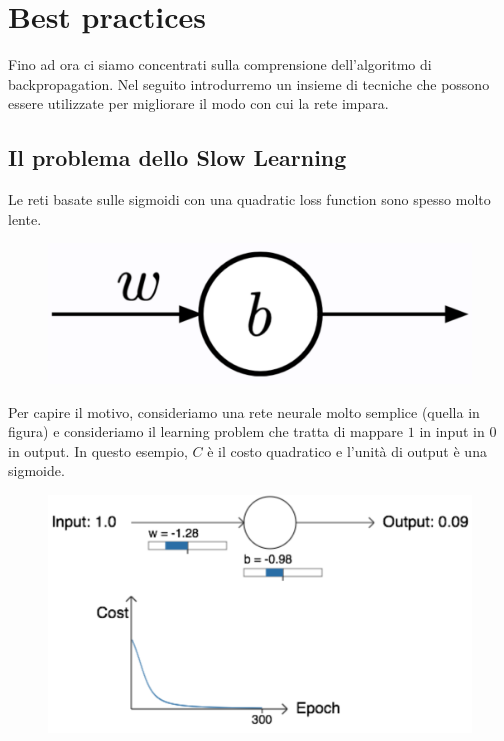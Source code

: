 \chapter{Best practices}
Fino ad ora ci siamo concentrati sulla comprensione dell'algoritmo di backpropagation. Nel seguito introdurremo un insieme di tecniche che possono essere utilizzate per migliorare il modo con cui la rete impara.
\section{Il problema dello Slow Learning}
Le reti basate sulle sigmoidi con una quadratic loss function sono spesso molto lente.
\begin{figure}[h]
    \includegraphics[scale=.5]{images/best_practices/slow_net.png}
    \centering
\end{figure}



Per capire il motivo, consideriamo una rete neurale molto semplice (quella in figura) e consideriamo il learning problem che tratta di mappare $1$ in input in $0$ in output. In questo esempio, $C$ è il costo quadratico e l'unità di output è una sigmoide.
\newpage
\begin{figure}[h]
    \includegraphics[scale=.4]{images/best_practices/first_graph.png}
    \centering
\end{figure}



